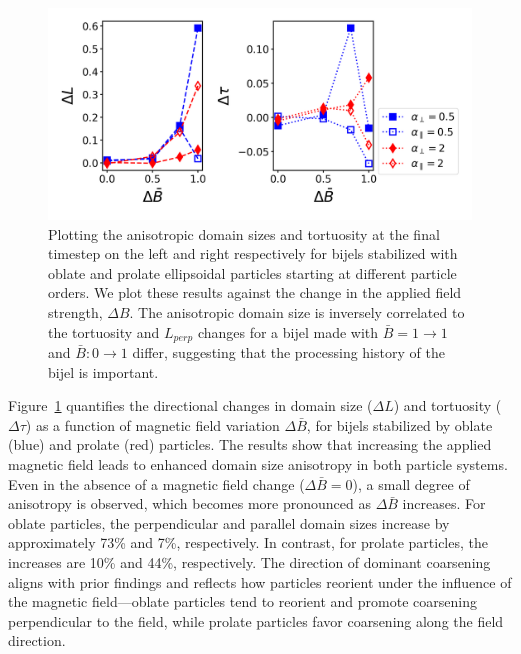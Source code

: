 \begin{figure} 
\centering 
\includegraphics[scale = 0.5]{../figures/results/paper2/domain_size_aniso-field_up.png} 
\caption{Plotting the anisotropic domain sizes and tortuosity at the final timestep on the left and right respectively for bijels stabilized with 
         oblate and prolate ellipsoidal particles starting at different particle orders. We plot these results against the change in the applied field 
         strength, $\Delta B$. The anisotropic domain size is inversely correlated to the tortuosity and $L_{perp}$ changes for 
         a bijel made with $\bar{B} = 1 \rightarrow 1$ and $\bar{B}: 0 \rightarrow 1$ differ, suggesting that the processing history of the bijel is important.} 
\label{fig:domain_size_aniso-field_up} 
\end{figure}

Figure~\ref{fig:domain_size_aniso-field_up} quantifies the directional changes in domain size (\(\Delta L\)) and tortuosity (\(\Delta \tau\)) as a 
function of magnetic field variation \(\Delta \bar{B}\), for bijels stabilized by oblate (blue) and prolate (red) particles. The results show that 
increasing the applied magnetic field leads to enhanced domain size anisotropy in both particle systems. Even in the absence of a magnetic field 
change (\(\Delta \bar{B} = 0\)), a small degree of anisotropy is observed, which becomes more pronounced as \(\Delta \bar{B}\) increases. For oblate 
particles, the perpendicular and parallel domain sizes increase by approximately 73\% and 7\%, respectively. In contrast, for prolate particles, the 
increases are 10\% and 44\%, respectively. The direction of dominant coarsening aligns with prior findings and reflects how particles reorient under 
the influence of the magnetic field—oblate particles tend to reorient and promote coarsening perpendicular to the field, while prolate particles favor 
coarsening along the field direction.

